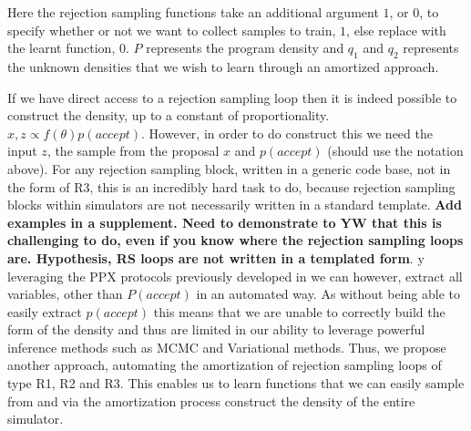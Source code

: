\documentclass{article}
\begin{document}
Here the rejection sampling functions take an additional argument $1$, or $0$,
to specify whether or not we want to collect samples to train, $1$, else replace with 
the learnt function, $0$. $P$ represents the program density and $q_{1}$ and $q_{2}$ represents 
the unknown densities that we wish to learn through an amortized approach.

If we have direct access to a rejection sampling loop then it is indeed 
possible to construct the density, up to a constant of proportionality. 
 $x,z \propto f(\theta) p(accept)$.
However, in order to do construct this we need the input $z$, the sample from the proposal $x$ and $p(accept)$ (should use the notation above).
For any rejection sampling block, written in a generic code base, not in the form of R3, this is an incredibly hard 
task to do, because rejection sampling blocks within simulators are not necessarily written in a standard template. 
\textbf{Add examples in a supplement.  Need to demonstrate to YW that this is challenging to do, even if you know where 
the rejection sampling loops are. Hypothesis, RS loops are not written in a templated form}.
y leveraging the PPX protocols previously developed in \cite{baydin2018efficient,gram2019hijacking} we can however, 
extract all variables, other than $P(accept)$ in an automated way.
As without being able to easily extract $p(accept)$ this means that we are unable to 
correctly build the form of the density and thus are limited in our ability to leverage 
powerful inference methods such as MCMC and Variational methods.
Thus, we propose another approach, automating the amortization of rejection sampling loops of type R1, R2 and R3. 
This enables us to learn functions that we can easily sample from and via the amortization process construct the density of the entire
simulator. 
\end{document}
